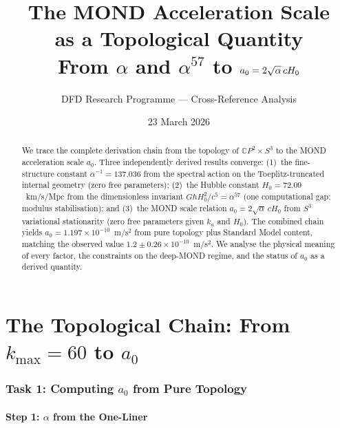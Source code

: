 \documentclass[12pt,a4paper]{article}
\title{The MOND Acceleration Scale\\as a Topological Quantity\\[8pt]
\large From $\alpha$ and $\alpha^{57}$ to $a_0 = 2\sqrt{\alpha}\,c\Hzero$}
\author{DFD Research Programme --- Cross-Reference Analysis}
\date{23 March 2026}
\newcommand{\CP}{\mathbb{C}P}
\newcommand{\Hzero}{H_0}
\newcommand{\ee}[1]{\times 10^{#1}}
\begin{document}
\maketitle

\begin{abstract}
We trace the complete derivation chain from the topology of $\CP^2 \times S^3$
to the MOND acceleration scale $a_0$.  Three independently derived results
converge: (1)~the fine-structure constant $\alpha^{-1} = 137.036$ from the
spectral action on the Toeplitz-truncated internal geometry (zero free
parameters); (2)~the Hubble constant $\Hzero = 72.09$~km/s/Mpc from the
dimensionless invariant $G\hbar\Hzero^2/c^5 = \alpha^{57}$ (one
computational gap: modulus stabilisation); and (3)~the MOND scale relation
$a_0 = 2\sqrt{\alpha}\,c\Hzero$ from $S^3$ variational stationarity (zero
free parameters given $k_a$ and $\Hzero$).  The combined chain yields
$a_0 = 1.197 \ee{-10}$~m/s$^2$ from pure topology plus Standard Model
content, matching the observed value $1.2 \pm 0.26 \ee{-10}$~m/s$^2$.  We
analyse the physical meaning of every factor, the constraints on the
deep-MOND regime, and the status of $a_0$ as a derived quantity.
\end{abstract}

\tableofcontents
\newpage


\part{The Topological Chain: From $k_{\max} = 60$ to $a_0$}


\section{Task 1: Computing $a_0$ from Pure Topology}
\label{sec:computation}

\subsection{Step 1: $\alpha$ from the One-Liner}
\end{document}
